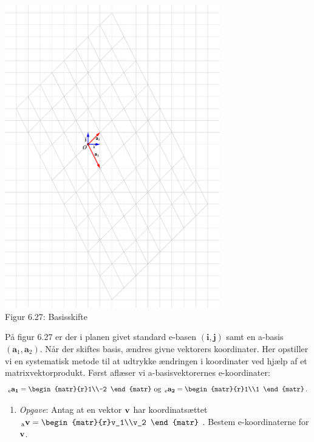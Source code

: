 \begin{example}\label{tn6.koordmatrix3}
\begin{center}
		\includegraphics[trim=3cm 12.5cm 4.5cm 11cm,width=0.7\textwidth,clip]{geometer/abasis05.pdf}			
		\\Figur 6.27: Basisskifte
\end{center}
På figur 6.27 er der i planen givet standard e-basen $(\mathbf i, \mathbf j)$ samt en a-basis $(\mathbf a_1, \mathbf a_2)$. Når der skiftes basis, ændres givne vektorers koordinater. Her opstiller vi en systematisk metode til at udtrykke ændringen i koordinater ved hjælp af et matrixvektorprodukt. Først aflæser vi a-basisvektorernes e-koordinater:
\begin{equation}
{_\mathrm{e}\mathbf{a_1}}=\begin{matr}{r}1\\-2 \end{matr}\,\,\mathrm{og}\,\,\,{_\mathrm{e}\mathbf{a_2}}=\begin{matr}{r}1\\1 \end{matr}\,.
\end{equation}
\begin{enumerate}
\item
\textit{Opgave}: Antag at en vektor $\mathbf{v}$ har koordinatsættet ${_\mathrm{a}\mathbf{v}}=\begin{matr}{r}v_1\\v_2 \end{matr}$\,. Bestem e-koordinaterne for $\mathbf{v}$.\\


\end{enumerate}
\end{example}
